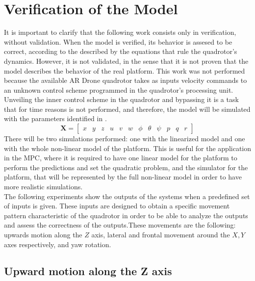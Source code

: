 \section{Verification of the Model}


It is important to clarify that the following work consists only in verification, without validation. When the model is verified, its behavior is assesed to be correct, according to the described by the equations that rule the quadrotor's dynamics. However, it is not validated, in the sense that it is not proven that the model describes the behavior of the real platform. This work was not performed because the available AR Drone quadrotor takes as inputs velocity commands to an unknown control scheme programmed in the quadrotor's processing unit. Unveiling the inner control scheme in the quadrotor and bypassing it is a task that for time reasons is not performed, and therefore, the model will be simulated with the parameters identified in \cite{YueSun2012}. \\
\begin{equation} \label{eq:statevector}
\mathbf{X} = \begin{bmatrix} x & y & z & u & v & w & \phi & \theta & \psi & p & q & r \end{bmatrix}
\end{equation} 
There will be two simulations performed: one with the linearized model and one with the whole non-linear model of the platform. This is useful for the application in the MPC, where it is required to have one linear model for the platform to perform the predictions and set the quadratic problem, and the simulator for the platform, that will be represented by the full non-linear model in order to have more realistic simulations. \\

The following experiments show the outputs of the systems when a predefined set of inputs is given. These inputs are designed to obtain a specific movement pattern characteristic of the quadrotor in order to be able to analyze the outputs and assess the correctness of the outputs.These movements are the following: upwards motion along the $Z$ axis, lateral and frontal movement around the $X,Y$ axes respectively, and yaw rotation. 

\subsection{Upward motion along the Z axis}

